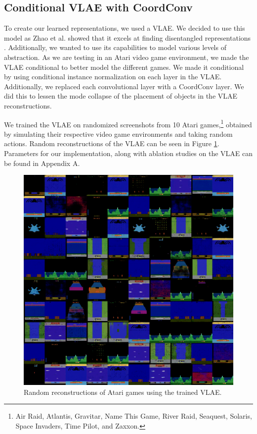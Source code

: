 \documentclass{article}
\begin{document}
\subsection{Conditional VLAE with CoordConv}

To create our learned representations, we used a VLAE.
We decided to use this model as Zhao et al. showed that it excels at finding disentangled representations \cite{zhao:learning}.
Additionally, we wanted to use its capabilities to model various levels of abstraction.
As we are testing in an Atari video game environment, we made the VLAE conditional to better model the different games.
We made it conditional by using conditional instance normalization on each layer in the VLAE.
Additionally, we replaced each convolutional layer with a CoordConv layer.
We did this to lessen the mode collapse of the placement of objects in the VLAE reconstructions.

We trained the VLAE on randomized screenshots from 10 Atari games,\footnote{Air Raid, Atlantis, Gravitar, Name This Game, River Raid, Seaquest, Solaris, Space Invaders, Time Pilot, and Zaxxon.}  obtained by simulating their respective video game environments and taking random actions.
Random reconstructions of the VLAE can be seen in Figure \ref{fig:vlae}.
Parameters for our implementation, along with ablation studies on the VLAE can be found in Appendix A.

\begin{figure}
  \includegraphics[width=0.8\linewidth]{current.png}
  \caption{Random reconstructions of Atari games using the trained VLAE.}
  \label{fig:vlae}
\end{figure}
\end{document}
